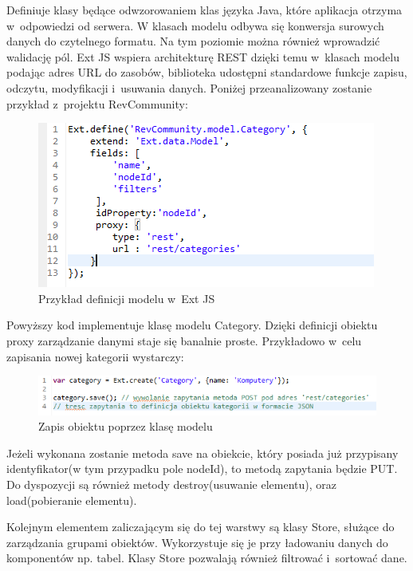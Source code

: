 Definiuje klasy będące odwzorowaniem klas języka Java, które aplikacja otrzyma w~odpowiedzi od serwera. W klasach modelu odbywa się konwersja surowych danych do czytelnego formatu. Na tym poziomie można również wprowadzić walidację pól. Ext JS wspiera architekturę REST dzięki temu w~klasach modelu podając adres URL do zasobów, biblioteka udostępni standardowe funkcje zapisu, odczytu, modyfikacji i~usuwania danych. Poniżej przeanalizowany zostanie przykład z~projektu RevCommunity:

\begin{figure}[H]
	\centering
	\includegraphics[width=\textwidth]{images/ext_model.png}
	\caption{Przykład definicji modelu w~Ext JS}
\end{figure}

Powyższy kod implementuje klasę modelu Category. Dzięki definicji obiektu proxy zarządzanie danymi staje się banalnie proste. Przykładowo w~celu zapisania nowej kategorii wystarczy:

\begin{figure}[H]
	\centering
	\includegraphics[width=\textwidth]{images/save_model.png}
	\caption{Zapis obiektu poprzez klasę modelu}
\end{figure}

Jeżeli wykonana zostanie metoda save na obiekcie, który posiada już przypisany identyfikator(w tym przypadku pole nodeId), to metodą zapytania będzie PUT.
Do dyspozycji są również metody destroy(usuwanie elementu), oraz load(pobieranie elementu).

Kolejnym elementem zaliczającym się do tej warstwy są klasy Store, służące do zarządzania grupami obiektów. Wykorzystuje się je przy ładowaniu danych do komponentów np. tabel. 
Klasy Store pozwalają również filtrować i~sortować dane.

